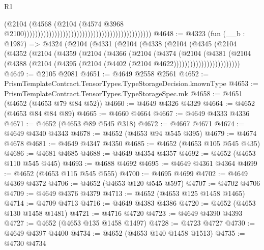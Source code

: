 \begin{lexlean}{R1}
\begin{coremodule}
                                                                                        (@2104
                                                                                          (@4568
                                                                                            (@2104
                                                                                              (@4574
                                                                                                @3968
                                                                                                @2100))))))))))))))))))))))))))))))))))))))))))))))
@4648 := @4323
    (fun (__b : @1987) =>
    @4324
      (@2104
        (@4331
          (@2104
            (@4338
              (@2104
                (@4345
                  (@2104
                    (@4352
                      (@2104
                        (@4359
                          (@2104
                            (@4366
                              (@2104
                                (@4374
                                  (@2104
                                    (@4381
                                      (@2104
                                        (@4388
                                          (@2104
                                            (@4395
                                              (@2104 (@4402 (@2104 @4622))))))))))))))))))))))))
@4649 := @2105 @2081
@4651 := @4649 @2558 @2561
@4652 := PrismTemplateContract.TensorTypes.TypeStorageDecision.knownType
@4653 := PrismTemplateContract.TensorTypes.TypeStorageSpec.mk
@4658 := @4651 (@4652 (@4653 @79 @84 @52))
@4660 := @4649 @4326 @4329
@4664 := @4652 (@4653 @84 @84 @89)
@4665 := @4660 @4664
@4667 := @4649 @4333 @4336
@4671 := @4652 (@4653 @89 @545 @318)
@4672 := @4667 @4671
@4674 := @4649 @4340 @4343
@4678 := @4652 (@4653 @94 @545 @395)
@4679 := @4674 @4678
@4681 := @4649 @4347 @4350
@4685 := @4652 (@4653 @105 @545 @435)
@4686 := @4681 @4685
@4688 := @4649 @4354 @4357
@4692 := @4652 (@4653 @110 @545 @445)
@4693 := @4688 @4692
@4695 := @4649 @4361 @4364
@4699 := @4652 (@4653 @115 @545 @555)
@4700 := @4695 @4699
@4702 := @4649 @4369 @4372
@4706 := @4652 (@4653 @120 @545 @597)
@4707 := @4702 @4706
@4709 := @4649 @4376 @4379
@4713 := @4652 (@4653 @125 @1458 @1465)
@4714 := @4709 @4713
@4716 := @4649 @4383 @4386
@4720 := @4652 (@4653 @130 @1458 @1481)
@4721 := @4716 @4720
@4723 := @4649 @4390 @4393
@4727 := @4652 (@4653 @135 @1458 @1497)
@4728 := @4723 @4727
@4730 := @4649 @4397 @4400
@4734 := @4652 (@4653 @140 @1458 @1513)
@4735 := @4730 @4734

\end{coremodule}
\end{lexlean}
